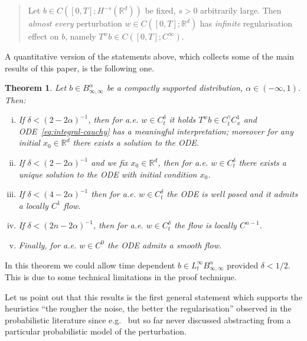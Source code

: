 \documentclass[10pt]{article}
\newcommand{\tmtextit}[1]{{\itshape{#1}}}
\newenvironment{enumerateroman}{\begin{enumerate}[i.] }{\end{enumerate}}
\newenvironment{quoteenv}{\begin{quote} }{\end{quote}}
\newtheorem{theorem}{Theorem}
\begin{document}
\begin{quoteenv}
  Let $b \in C ([0, T] ; H^{- s} (\mathbb{R}^d))$ be fixed, $s > 0$
  arbitrarily large. Then \tmtextit{almost every} perturbation $w \in C ([0,
  T] ; \mathbb{R}^d)$ has \tmtextit{infinite} regularisation effect on $b$,
  namely $T^w b \in C ([0, T] ; C^{\infty})$.
\end{quoteenv}

A quantitative version of the statements above, which collects some of the
main results of this paper, is the following one.

\begin{theorem}
  \label{intro_main_thm}Let $b \in B^{\alpha}_{\infty, \infty}$ be a compactly
  supported distribution, $\alpha \in (- \infty, 1)$. Then:
  \begin{enumerateroman}
    \item If $\delta < (2 - 2 \alpha)^{- 1}$, then for a.e. $w \in
    C_t^{\delta}$ it holds $T^w b \in C^{\gamma}_t C^1_x$ and
    ODE~{\eqref{eq:integral-cauchy}} has a meaningful interpretation; moreover
    for any initial $x_0 \in \mathbb{R}^d$ there exists a solution to the ODE.
    
    \item If $\delta < (2 - 2 \alpha)^{- 1}$ and we fix $x_0 \in
    \mathbb{R}^d$, then for a.e. $w \in C_t^{\delta}$ there exists a unique
    solution to the ODE with initial condition $x_0$.
    
    \item If $\delta < (4 - 2 \alpha)^{- 1}$ then for a.e. $w \in
    C_t^{\delta}$ the ODE is well posed and it admits a locally $C^1$ flow.
    
    \item If $\delta < (2 n - 2 \alpha)^{- 1}$, then for a.e. $w \in
    C_t^{\delta}$ the flow is locally $C^{n - 1}$.
    
    \item Finally, for a.e. $w \in C^0$ the ODE admits a smooth flow.
  \end{enumerateroman}
\end{theorem}

\begin{remark}
  In this theorem we could allow time dependent $b \in L^{\infty}_t
  B^{\alpha}_{\infty, \infty}$ provided $\delta < 1 / 2$. This is due to some
  technical limitations in the proof technique.
\end{remark}

Let us point out that this results is the first general statement which
supports the heuristics ``the rougher the noise, the better the
regularisation'' observed in the probabilistic literature since
e.g.~{\cite{catelliergubinelli}} but so far never discussed abstracting from a
particular probabilistic model of the perturbation.
\end{document}
